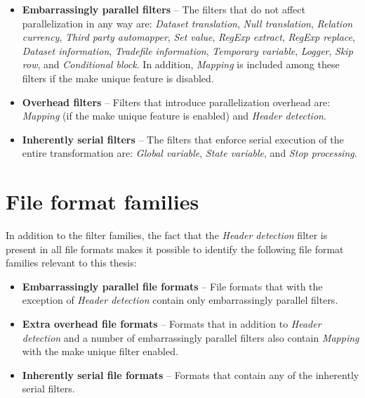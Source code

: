 \begin{itemize}
\item \textbf{Embarrassingly parallel filters} --
The filters that do not affect parallelization in any way are:
\textit{Dataset translation}, \textit{Null translation}, \textit{Relation currency},
\textit{Third party automapper}, \textit{Set value}, \textit{RegExp extract}, \textit{RegExp replace},
\textit{Dataset information}, \textit{Tradefile information}, \textit{Temporary variable}, \textit{Logger}, \textit{Skip row}, and \textit{Conditional block}.
In addition, \textit{Mapping} is included among these filters if the make unique feature is disabled.
\item \textbf{Overhead filters} -- 
Filters that introduce parallelization overhead are: \textit{Mapping} (if the make unique feature is enabled) and \textit{Header detection}.
\item \textbf{Inherently serial filters} --
The filters that enforce serial execution of the entire transformation are: \textit{Global variable}, \textit{State variable}, and \textit{Stop processing}.
\end{itemize}

\section{File format families}
In addition to the filter families, the fact that the \textit{Header detection} filter is present in all file formats makes it possible to identify the following
file format families relevant to this thesis:

\begin{itemize}
\item \textbf{Embarrassingly parallel file formats} --
  File formats that with the exception of \textit{Header detection} contain only embarrassingly parallel filters. 
\item \textbf{Extra overhead file formats} --
  Formats that in addition to \textit{Header detection} and a number of embarrassingly parallel filters also contain \textit{Mapping} with the make unique filter enabled.
\item \textbf{Inherently serial file formats} --
  Formats that contain any of the inherently serial filters.
\end{itemize}

